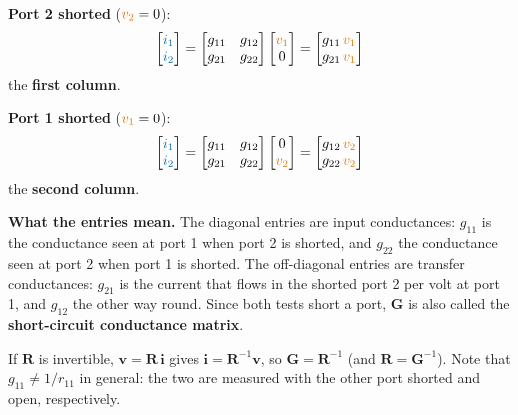 \documentclass[11pt,a4paper]{article}
\newcommand{\Icol}[1]{\textcolor{ccur}{#1}}
\newcommand{\Vcol}[1]{\textcolor{cvolt}{#1}}
\newcommand{\vone}{\Vcol{v_1}}  \newcommand{\vtwo}{\Vcol{v_2}}
\newcommand{\ione}{\Icol{i_1}}  \newcommand{\itwo}{\Icol{i_2}}
\newcommand{\Rm}{\mathbf{R}}  \newcommand{\Gm}{\mathbf{G}}
\begin{document}
\smallskip
\noindent
\begin{minipage}[t]{0.49\linewidth}
\centering
\textbf{Port 2 shorted} ($\vtwo = 0$):
\[
  \begin{bmatrix} \ione\\ \itwo \end{bmatrix}
  = \begin{bmatrix} g_{11} & g_{12}\\ g_{21} & g_{22} \end{bmatrix}
    \begin{bmatrix} \vone\\ 0 \end{bmatrix}
  = \begin{bmatrix} g_{11}\,\vone\\ g_{21}\,\vone \end{bmatrix}
\]
the \textbf{first column}.
\end{minipage}\hfill
\begin{minipage}[t]{0.49\linewidth}
\centering
\textbf{Port 1 shorted} ($\vone = 0$):
\[
  \begin{bmatrix} \ione\\ \itwo \end{bmatrix}
  = \begin{bmatrix} g_{11} & g_{12}\\ g_{21} & g_{22} \end{bmatrix}
    \begin{bmatrix} 0\\ \vtwo \end{bmatrix}
  = \begin{bmatrix} g_{12}\,\vtwo\\ g_{22}\,\vtwo \end{bmatrix}
\]
the \textbf{second column}.
\end{minipage}

\medskip
\textbf{What the entries mean.} The diagonal entries are input conductances: $g_{11}$ is the
conductance seen at port 1 when port 2 is shorted, and $g_{22}$ the conductance seen at port 2
when port 1 is shorted. The off-diagonal entries are transfer conductances: $g_{21}$ is the
current that flows in the shorted port 2 per volt at port 1, and $g_{12}$ the other way round.
Since both tests short a port, $\Gm$ is also called the \textbf{short-circuit conductance
matrix}.

If $\Rm$ is invertible, $\mathbf{v} = \Rm\,\mathbf{i}$ gives $\mathbf{i} = \Rm^{-1}\mathbf{v}$, so
$\Gm = \Rm^{-1}$ (and $\Rm = \Gm^{-1}$). Note that $g_{11} \neq 1/r_{11}$ in general: the two
are measured with the other port shorted and open, respectively.
\end{document}
